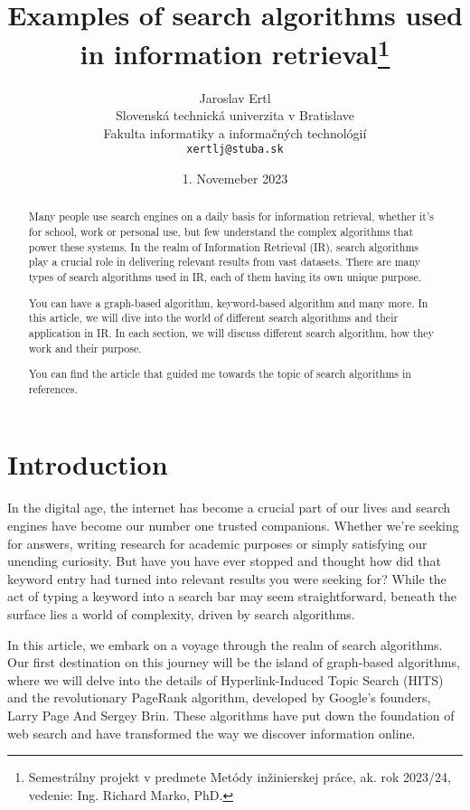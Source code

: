 \documentclass[10pt,twoside,slovak,a4paper]{article}
\title{Examples of search algorithms used in information retrieval\thanks{Semestrálny projekt v predmete Metódy inžinierskej práce, ak. rok 2023/24, vedenie: Ing. Richard Marko, PhD.}}
\author{Jaroslav Ertl\\[2pt]
	{\small Slovenská technická univerzita v Bratislave}\\
	{\small Fakulta informatiky a informačných technológií}\\
	{\small \texttt{xertlj@stuba.sk}}
	}
\date{\small 1. Novemeber 2023}
\begin{document}
\maketitle
 
\begin{abstract}
    Many people use search engines on a daily basis for information retrieval, whether it's for school, work or personal use, but few understand the complex algorithms that power these systems.  In the realm of Information Retrieval (IR), search algorithms play a crucial role in delivering relevant results from vast datasets. There are many types of search algorithms used in IR, each of them having its own unique purpose. 

  You can have a graph-based algorithm, keyword-based algorithm and many more. In this article, we will dive into the world of different search algorithms and their application in IR. In each section, we will discuss different search algorithm, how they work and their purpose.
    
You can find the article that guided me towards the topic of search algorithms in references.\cite{10210566}
\end{abstract}
\section{Introduction}
In the digital age, the internet has become a crucial part of our lives and search engines have become our number one trusted companions. Whether we're seeking for answers, writing research for academic purposes or simply satisfying our unending curiosity. But have you have ever stopped and thought how did that keyword entry had turned into relevant results you were seeking for? While the act of typing a keyword into a search bar may seem straightforward, beneath the surface lies a world of complexity, driven by search algorithms. 

In this article, we embark on a voyage through the realm of search algorithms. Our first destination on this journey will be the island of graph-based algorithms, where we will delve into the details of Hyperlink-Induced Topic Search (HITS) and the revolutionary PageRank algorithm, developed by Google's founders, Larry Page And Sergey Brin. These algorithms have put down the foundation of web search and have transformed the way we discover information online. 
\end{document}

